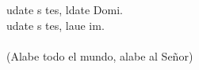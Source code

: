 \begin{cancion}%
	udate s tes, ldate Domi.\\
	udate s tes, laue im.\\
	\jump\\
(Alabe todo el mundo, alabe al Señor)\\
\end{cancion}%
